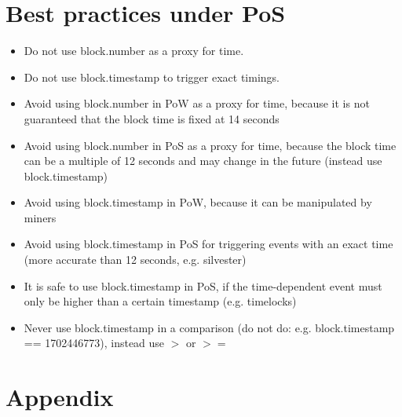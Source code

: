 \section{Best practices under PoS}

\begin{itemize}
  \item Do not use block.number as a proxy for time.
  \item Do not use block.timestamp to trigger exact timings.
  \item Avoid using block.number in PoW as a proxy for time, because it is not guaranteed that the block time is fixed at 14 seconds \\
  \item Avoid using block.number in PoS as a proxy for time, because the block time can be a multiple of 12 seconds and may change in the future (instead use block.timestamp)\\
  \item Avoid using block.timestamp in PoW, because it can be manipulated by miners \\
  \item Avoid using block.timestamp in PoS for triggering events with an exact time (more accurate than 12 seconds, e.g. silvester) \\
  \item It is safe to use block.timestamp in PoS, if the time-dependent event must only be higher than a certain timestamp (e.g. timelocks) \\
  \item Never use block.timestamp in a comparison (do not do: e.g. block.timestamp == 1702446773), instead use $>$ or $>=$
\end{itemize}

\section{Appendix}
\label{appendix}









